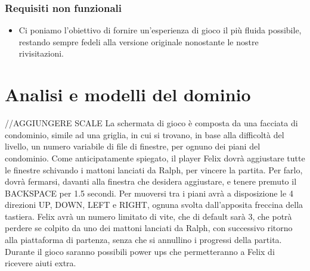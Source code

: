 \subsubsection{Requisiti non funzionali}
\begin{itemize}
	\item Ci poniamo l'obiettivo di fornire un'esperienza di gioco il più fluida possibile, restando sempre fedeli alla versione originale nonostante le nostre rivisitazioni.
\end{itemize}

\section{Analisi e modelli del dominio}
//AGGIUNGERE SCALE
La schermata di gioco è composta da una facciata di condominio, simile ad una griglia, in cui si trovano, in base alla difficoltà del livello, un numero variabile di file di finestre, per ognuno dei piani del condominio.
Come anticipatamente spiegato, il player Felix dovrà aggiustare tutte le finestre schivando i mattoni lanciati da Ralph, per vincere la partita.
Per farlo, dovrà fermarsi, davanti alla finestra che desidera aggiustare, e tenere premuto il BACKSPACE per 1.5 secondi. 
Per muoversi tra i piani avrà a disposizione le 4 direzioni UP, DOWN, LEFT e RIGHT, ognuna svolta dall'apposita freccina della tastiera. 
Felix avrà un numero limitato di vite, che di default sarà 3, che potrà perdere se colpito da uno dei mattoni lanciati da Ralph, con successivo ritorno alla piattaforma di partenza, senza che si annullino i progressi della partita.
Durante il gioco saranno possibili power ups che permetteranno a Felix di ricevere aiuti extra.


